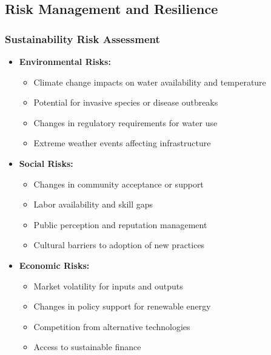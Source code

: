 \subsection{Risk Management and Resilience}

\subsubsection{Sustainability Risk Assessment}
\begin{itemize}
    \item \textbf{Environmental Risks:}
    \begin{itemize}
        \item Climate change impacts on water availability and temperature
        \item Potential for invasive species or disease outbreaks
        \item Changes in regulatory requirements for water use
        \item Extreme weather events affecting infrastructure
    \end{itemize}
    
    \item \textbf{Social Risks:}
    \begin{itemize}
        \item Changes in community acceptance or support
        \item Labor availability and skill gaps
        \item Public perception and reputation management
        \item Cultural barriers to adoption of new practices
    \end{itemize}
    
    \item \textbf{Economic Risks:}
    \begin{itemize}
        \item Market volatility for inputs and outputs
        \item Changes in policy support for renewable energy
        \item Competition from alternative technologies
        \item Access to sustainable finance
    \end{itemize}
\end{itemize}

